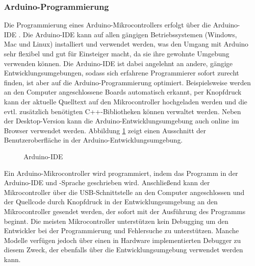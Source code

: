 \subsubsection{Arduino-Programmierung}
Die Programmierung eines Arduino-Mikrocontrollers erfolgt über die Arduino-IDE \cite{arduino_ide}. Die Arduino-IDE kann auf allen gängigen Betriebssystemen (Windows, Mac und Linux) installiert und verwendet werden, was den Umgang mit Arduino sehr flexibel und gut für Einsteiger macht, da sie ihre gewohnte Umgebung verwenden können. Die Arduino-IDE ist dabei angelehnt an andere, gängige Entwicklungsumgebungen, sodass sich erfahrene Programmierer sofort zurecht finden, ist aber auf die Arduino-Programmierung optimiert. Beispielsweise werden an den Computer angeschlossene Boards automatisch erkannt, per Knopfdruck kann der aktuelle Quelltext auf den Mikrocontroller hochgeladen werden und die evtl. zusätzlich benötigten C++-Bibliotheken können verwaltet werden. Neben der Desktop-Version kann die Arduino-Entwicklungsumgebung auch online im Browser verwendet werden. Abbildung \ref{img:arduino_ide} zeigt einen Ausschnitt der Benutzeroberfläche in der Arduino-Entwicklungsumgebung.
\begin{figure}[H]
    \centering
    \caption{Arduino-IDE}
    \label{img:arduino_ide}
\end{figure}
\noindent
Ein Arduino-Mikrocontroller wird programmiert, indem das Programm in der Arduino-IDE und -Sprache geschrieben wird. Anschließend kann der Mikrocontroller über die USB-Schnittstelle an den Computer angeschlossen und der Quellcode durch Knopfdruck in der Entwicklungsumgebung an den Mikrocontroller gesendet werden, der sofort mit der Ausführung des Programms beginnt. Die meisten Mikrocontroller unterstützen kein Debugging um den Entwickler bei der Programmierung und Fehlersuche zu unterstützen. Manche Modelle verfügen jedoch über einen in Hardware implementierten Debugger zu diesem Zweck, der ebenfalls über die Entwicklungsumgebung verwendet werden kann.\\\\
